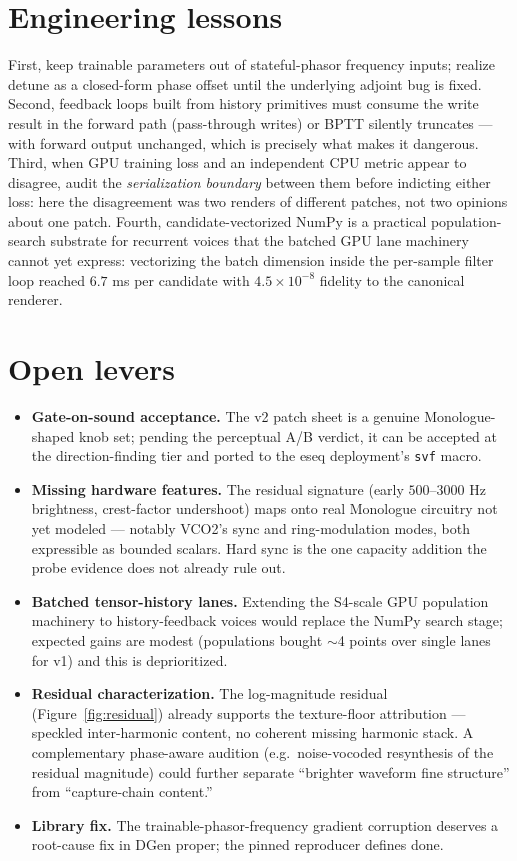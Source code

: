 \documentclass[10pt]{article}
\newcommand{\code}[1]{\texttt{#1}}
\begin{document}
\section{Engineering lessons}

First, keep trainable parameters out of stateful-phasor frequency inputs; realize detune as a closed-form phase offset until the underlying adjoint bug is fixed. Second, feedback loops built from history primitives must consume the write result in the forward path (pass-through writes) or BPTT silently truncates --- with forward output unchanged, which is precisely what makes it dangerous. Third, when GPU training loss and an independent CPU metric appear to disagree, audit the \emph{serialization boundary} between them before indicting either loss: here the disagreement was two renders of different patches, not two opinions about one patch. Fourth, candidate-vectorized NumPy is a practical population-search substrate for recurrent voices that the batched GPU lane machinery cannot yet express: vectorizing the batch dimension inside the per-sample filter loop reached $6.7$ ms per candidate with $4.5\times10^{-8}$ fidelity to the canonical renderer.

\section{Open levers}

\begin{itemize}
  \item \textbf{Gate-on-sound acceptance.} The v2 patch sheet is a genuine Monologue-shaped knob set; pending the perceptual A/B verdict, it can be accepted at the direction-finding tier and ported to the eseq deployment's \code{svf} macro.
  \item \textbf{Missing hardware features.} The residual signature (early $500$--$3000$ Hz brightness, crest-factor undershoot) maps onto real Monologue circuitry not yet modeled --- notably VCO2's sync and ring-modulation modes, both expressible as bounded scalars. Hard sync is the one capacity addition the probe evidence does not already rule out.
  \item \textbf{Batched tensor-history lanes.} Extending the S4-scale GPU population machinery to history-feedback voices would replace the NumPy search stage; expected gains are modest (populations bought $\sim$4 points over single lanes for v1) and this is deprioritized.
  \item \textbf{Residual characterization.} The log-magnitude residual (Figure~\ref{fig:residual}) already supports the texture-floor attribution --- speckled inter-harmonic content, no coherent missing harmonic stack. A complementary phase-aware audition (e.g.\ noise-vocoded resynthesis of the residual magnitude) could further separate ``brighter waveform fine structure'' from ``capture-chain content.''
  \item \textbf{Library fix.} The trainable-phasor-frequency gradient corruption deserves a root-cause fix in DGen proper; the pinned reproducer defines done.
\end{itemize}
\end{document}
